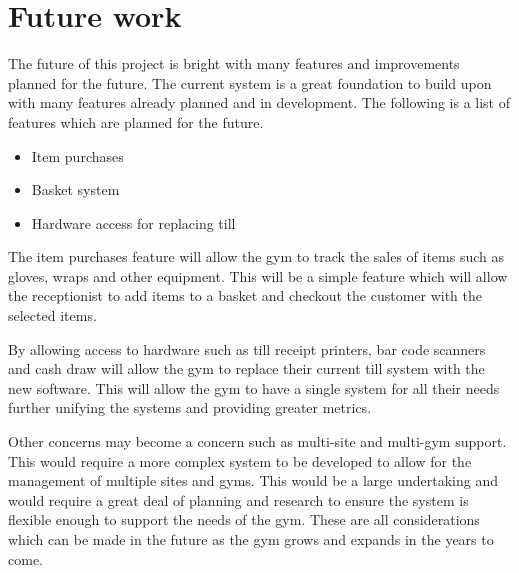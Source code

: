 \section{Future work}

The future of this project is bright with many features and improvements planned for the future. The current system is a great foundation to build upon with many features already planned and in development. The following is a list of features which are planned for the future.

\begin{itemize}
    \item Item purchases
    \item Basket system
    \item Hardware access for replacing till
\end{itemize}

The item purchases feature will allow the gym to track the sales of items such as gloves, wraps and other equipment. This will be a simple feature which will allow the receptionist to add items to a basket and checkout the customer with the selected items.

By allowing access to hardware such as till receipt printers, bar code scanners and cash draw will allow the gym to replace their current till system with the new software. This will allow the gym to have a single system for all their needs further unifying the systems and providing greater metrics.

Other concerns may become a concern such as multi-site and multi-gym support. This would require a more complex system to be developed to allow for the management of multiple sites and gyms. This would be a large undertaking and would require a great deal of planning and research to ensure the system is flexible enough to support the needs of the gym. These are all considerations which can be made in the future as the gym grows and expands in the years to come.
